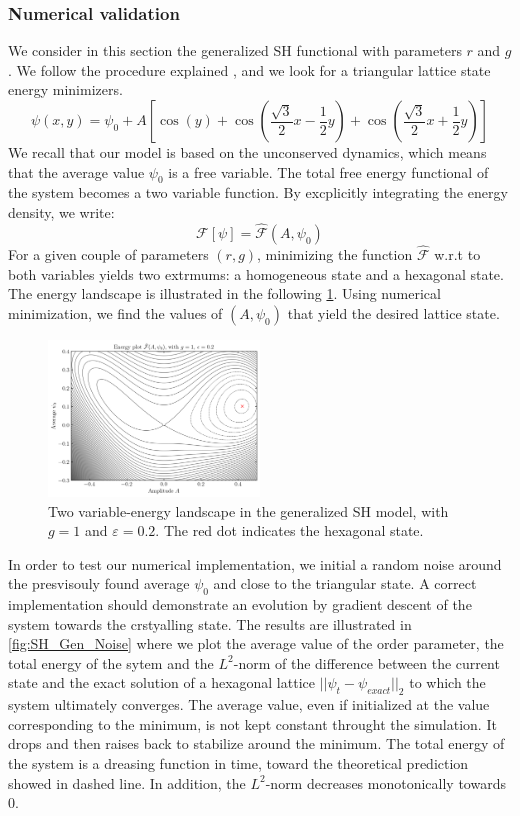 \documentclass{article}
\begin{document}
\subsubsection{Numerical validation}
We consider in this section the generalized SH functional with parameters $r$ and $g$. We follow the procedure explained  \cite{elderModelingelastic2004}, and we look for a triangular lattice state energy minimizers.
\begin{equation}
   \psi(x,y)=\psi_0+ A \left[ \cos(y)+ \cos\left( \frac{\sqrt{3}}{2}x -\frac{1}{2}y \right) +\cos\left( \frac{\sqrt{3}}{2}x +\frac{1}{2}y \right) \right]
\end{equation}
We recall that our model is based on the unconserved dynamics, which means that the average value $\psi_0$ is a free variable. The total free energy functional of the system becomes a two variable function. By excplicitly integrating the energy density, we write:
\begin{equation}
   \mathcal{F}[\psi] = \hat{\mathcal{F}}(A,\psi_0)
\end{equation}
For a given couple of parameters $(r,g)$, minimizing the function $\hat{\mathcal{F}}$ w.r.t to both variables yields two extrmums: a homogeneous state and a hexagonal state. The energy landscape is illustrated in the following \cref{fig:SH_Gen_Landscape}. Using numerical minimization, we find the values of $(A,\psi_0)$ that yield the desired lattice state.
\begin{figure}[H]
   \centering
   \includegraphics[width=0.5\textwidth]{imgs/weakcoupling/dipole/Energy.png}
   \caption{Two variable-energy landscape in the generalized SH model, with $g=1$ and $\varepsilon=0.2$. The red dot indicates the hexagonal state.}\label{fig:SH_Gen_Landscape}
\end{figure}
In order to test our numerical implementation, we initial a random noise around the presvisouly found average $\psi_0$ and close to the triangular state. A correct implementation should demonstrate an evolution by gradient descent of the system towards the crstyalling state. The results are illustrated in \cref{fig:SH_Gen_Noise} where we plot the average value of the order parameter, the total energy of the sytem and the $L^2$-norm of the difference between the current state and the exact solution of a hexagonal lattice $||\psi_t-\psi_{exact}||_2$ to which the system ultimately converges. The average value, even if initialized at the value corresponding to the minimum, is not kept constant throught the simulation. It drops and then raises back to stabilize around the minimum. The total energy of the system is a dreasing function in time, toward the theoretical prediction showed in dashed line. In addition, the $L^2$-norm decreases monotonically towards 0.
\end{document}
